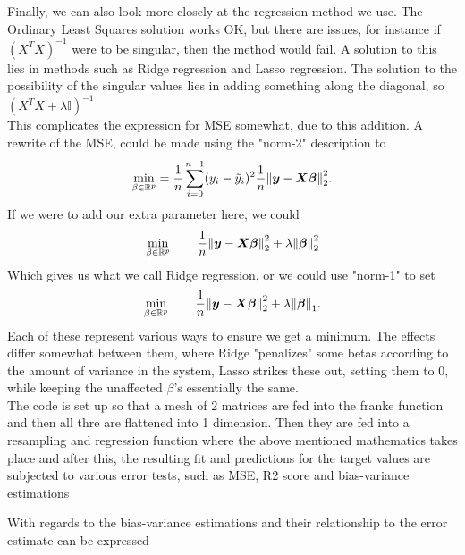 \documentclass[12pt]{revtex4-2}
\begin{document}
Finally, we can also look more closely at the regression method we use. The Ordinary 
Least Squares solution works OK, but there are issues, for instance if $(X^TX)^{-1}$
were to be singular, then the method would fail. A solution to this lies in methods
such as Ridge regression and Lasso regression. The solution to the possibility of 
the singular values lies in adding something along the diagonal, so
$(X^TX + \lambda\mathbb{I})^{-1}$\\

This complicates the expression for MSE somewhat, due to this addition. A rewrite of the 
MSE, could be made using the "norm-2" description to
\begin{align}
	\min_{\beta\in\mathbb{R}^p} =
		\frac{1}{n} \sum_{i=0}^{n-1} (y_i - \tilde{y}_i)^2 
		\frac{1}{n} \norm{\bm{y} - \bm{X\beta}}_2^2.
\end{align}
If we were to add our extra parameter here, we could 
\begin{align}
	\min_{\beta\in\mathbb{R}^p}\qq{} \frac{1}{n}\norm{\bm{y} - \bm{X\beta}}_2^2 
		+	\lambda\norm{\bm{\beta}}_2^2
\end{align}
Which gives us what we call Ridge regression, or we could use "norm-1" to set
\begin{align}
	\min_{\beta\in\mathbb{R}^p}\qq{} \frac{1}{n}\norm{\bm{y} - \bm{X\beta}}_2^2 
		+	\lambda\norm{\bm{\beta}}_1.
\end{align}
Each of these represent various ways to ensure we get a minimum. The effects differ 
somewhat between them, where Ridge "penalizes" some betas according to the amount of
variance in the system, Lasso strikes these out, setting them to 0, while keeping the 
unaffected $\beta$'s essentially the same. \\

The code is set up so that a mesh of 2 matrices are fed into the franke function and
then all thre are flattened into 1 dimension. Then they are fed into a resampling and
regression function where the above mentioned mathematics takes place and after this, 
the resulting fit and predictions for the target values are subjected to various error
tests, such as MSE, R2 score and bias-variance estimations

With regards to the bias-variance estimations and their relationship to the error 
estimate can be expressed
\end{document}
